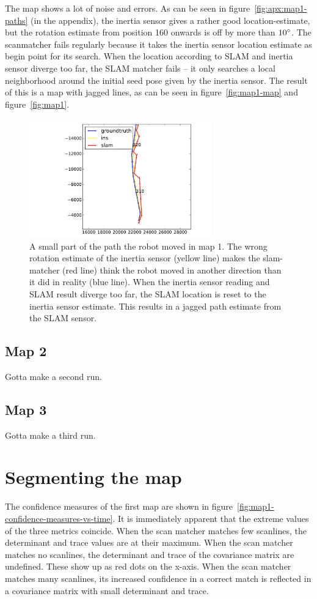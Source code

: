 The map shows a lot of noise and errors. As can be seen in figure~\ref{fig:apx:map1-paths} (in the appendix), the inertia sensor gives a rather good location-estimate, but the rotation estimate from position 160 onwards is off by more than $10\degree$. The scanmatcher fails regularly because it takes the inertia sensor location estimate as begin point for its search. When the location according to SLAM and inertia sensor diverge too far, the SLAM matcher fails -- it only searches a local neighborhood around the initial seed pose given by the inertia sensor. The result of this is a map with jagged lines, as can be seen in figure~\ref{fig:map1-map} and figure~\ref{fig:map1}.

\begin{figure}[ht]
  \centering
  \includegraphics[width=0.7\textwidth]{images/experiment/map1/ins-problem.pdf}
  \caption{A small part of the path the robot moved in map 1. The wrong rotation estimate of the inertia sensor (yellow line) makes the slam-matcher (red line) think the robot moved in another direction than it did in reality (blue line). When the inertia sensor reading and SLAM result diverge too far, the SLAM location is reset to the inertia sensor estimate. This results in a jagged path estimate from the SLAM sensor.}
  \label{fig:map1-ins-problem}
\end{figure}

\subsection{Map 2}
Gotta make a second run.

\subsection{Map 3}
Gotta make a third run.

\section{Segmenting the map}
The confidence measures of the first map are shown in figure~\ref{fig:map1-confidence-measures-vs-time}. It is immediately apparent that the extreme values of the three metrics coincide. When the scan matcher matches few scanlines, the determinant and trace values are at their maximum. When the scan matcher matches no scanlines, the determinant and trace of the covariance matrix are undefined. These show up as red dots on the x-axis. When the scan matcher matches many scanlines, its increased confidence in a correct match is reflected in a covariance matrix with small determinant and trace.

